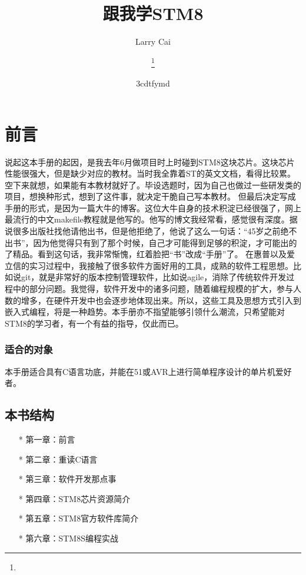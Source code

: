 \documentclass[a4paper]{book}
\title{{跟我学STM8}}
\author{Larry Cai}
\title{\huge{\savedtitle}}
\author{\textbf{\savedauthor}\thanks{}}
\date{\w3cdtfymd}
\begin{document}
\thispagestyle{empty}
\setcounter{tocdepth}{4}

\frontmatter
\chapter*{前言}

说起这本手册的起因，是我去年6月做项目时上时碰到STM8这块芯片。这块芯片性能很强大，但是缺少对应的教材。当时我全靠着ST的英文文档，看得比较累。空下来就想，如果能有本教材就好了。毕设选题时，因为自己也做过一些研发类的项目，想换种形式，想到了这件事，就决定干脆自己写本教材。 但最后决定写成手册的形式，是因为一篇大牛的博客。这位大牛自身的技术积淀已经很强了，网上最流行的中文makefile教程就是他写的。他写的博文我经常看，感觉很有深度。据说很多出版社找他请他出书，但是他拒绝了，他说了这么一句话：“45岁之前绝不出书”，因为他觉得只有到了那个时候，自己才可能得到足够的积淀，才可能出的了精品。看到这句话，我非常惭愧，红着脸把“书”改成“手册”了。 在惠普以及爱立信的实习过程中，我接触了很多软件方面好用的工具，成熟的软件工程思想。比如说git，就是非常好的版本控制管理软件，比如说agile，消除了传统软件开发过程中的部分问题。我觉得，软件开发中的诸多问题，随着编程规模的扩大，参与人数的增多，在硬件开发中也会逐步地体现出来。所以，这些工具及思想方式引入到嵌入式编程，将是一种趋势。本手册亦不指望能够引领什么潮流，只希望能对STM8的学习者，有一个有益的指导，仅此而已。

\subsection*{适合的对象}

本手册适合具有C语言功底，并能在51或AVR上进行简单程序设计的单片机爱好者。

\section*{本书结构}

\begin{itemize}\setlength{\itemsep}{1pt}\setlength{\parskip}{0pt}\setlength{\parsep}{0pt}
\item[*]
  第一章：前言
\item[*]
  第二章：重读C语言
\item[*]
  第三章：软件开发那点事
\item[*]
  第四章：STM8芯片资源简介
\item[*]
  第五章：STM8官方软件库简介
\item[*]
  第六章：STM8S编程实战
\end{itemize}
\end{document}
